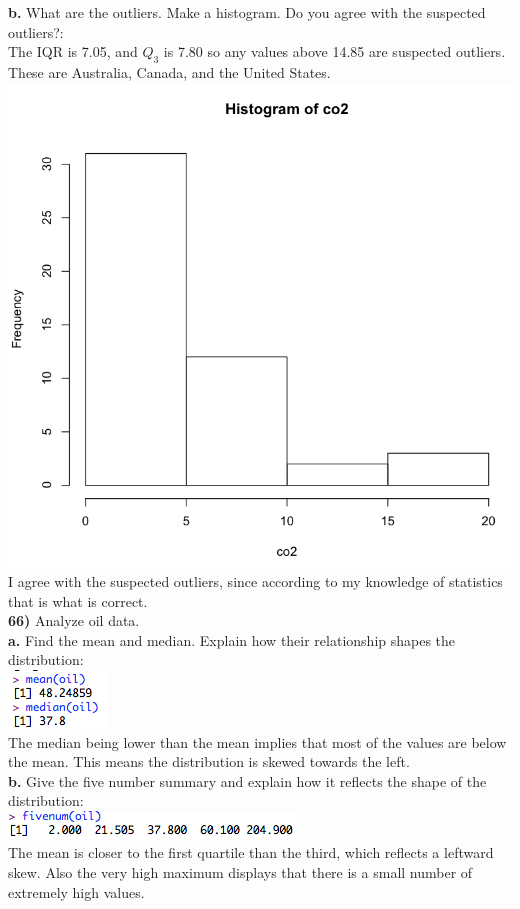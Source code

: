 \documentclass{scrartcl}
\begin{document}
\textbf{b.} What are the outliers. Make a histogram. Do you agree with the suspected outliers?:\\
The IQR is 7.05, and $Q_3$ is 7.80 so any values above 14.85 are suspected outliers. These are Australia, Canada, and the United States.\\
\includegraphics[keepaspectratio=true, scale=0.2]{ch1_64_histogram.png}\\
I agree with the suspected outliers, since according to my knowledge of statistics that is what is correct.\\

\textbf{66)} Analyze oil data.\\

\textbf{a.} Find the mean and median. Explain how their relationship shapes the distribution:\\
\includegraphics[keepaspectratio=true, scale=0.7]{ch1_66_meandian.png}\\
The median being lower than the mean implies that most of the values are below the mean. This means the distribution is skewed towards the left.\\

\textbf{b.} Give the five number summary and explain how it reflects the shape of the distribution:\\
\includegraphics[keepaspectratio=true, scale=0.75]{ch1_66_fivenum.png}\\
The mean is closer to the first quartile than the third, which reflects a leftward skew. Also the very high maximum displays that there is a small number of extremely high values.\\
\end{document}
